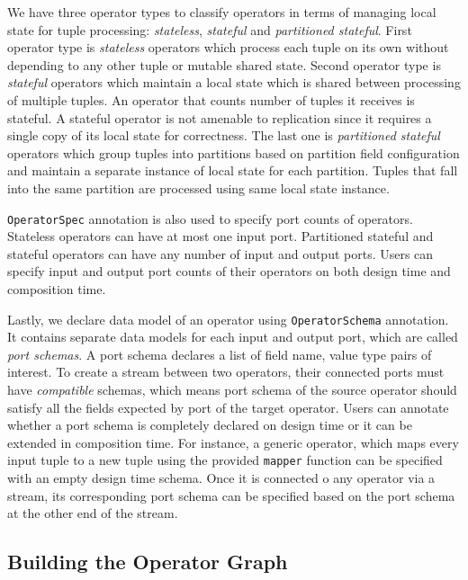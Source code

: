 We have three operator types to classify operators in terms of managing local state for tuple processing: \textit{stateless}, \textit{stateful} and \textit{partitioned stateful}. First operator type is \textit{stateless} operators which process each tuple on its own without depending to any other tuple or mutable shared state. Second operator type is \textit{stateful} operators which maintain a local state which is shared between processing of multiple tuples. An operator that counts number of tuples it receives is stateful. A stateful operator is not amenable to replication since it requires a single copy of its local state for correctness. The last one is \textit{partitioned stateful} operators which group tuples into partitions based on partition field configuration and maintain a separate instance of local state for each partition. Tuples that fall into the same partition are processed using same local state instance. 

\texttt{OperatorSpec} annotation is also used to specify port counts of operators. Stateless operators can have at most one input port. Partitioned stateful and stateful operators can have any number of input and output ports. Users can specify input and output port counts of their operators on both design time and composition time. 

Lastly, we declare data model of an operator using \texttt{OperatorSchema} annotation. It contains separate data models for each input and output port, which are called \textit{port schemas}. A port schema declares a list of field name, value type pairs of interest. To create a stream between two operators, their connected ports must have \textit{compatible} schemas, which means port schema of the source operator should satisfy all the fields expected by port of the target operator. Users can annotate whether a port schema is completely declared on design time or it can be extended in composition time. For instance, a generic  operator, which maps every input tuple to a new tuple using the provided \texttt{mapper} function can be specified with an empty design time schema. Once it is connected o any operator via a stream, its corresponding port schema can be specified based on the port schema at the other end of the stream.




\subsection{Building the Operator Graph}\label{sec:operator-graph}